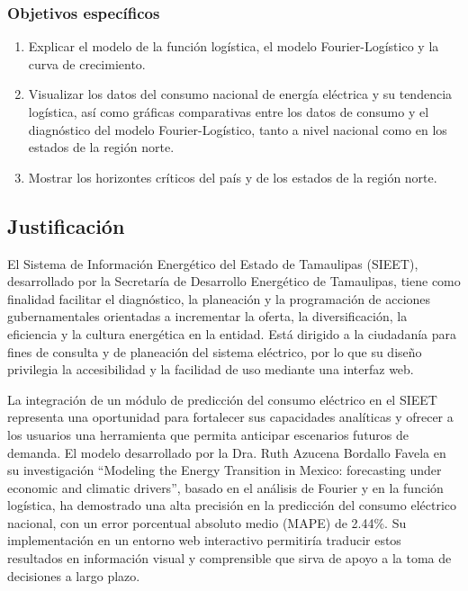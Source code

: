 \subsubsection{Objetivos específicos} \label{subsec:objetivos_especificos}
    \begin{enumerate}
       \item Explicar el modelo de la función logística, el modelo Fourier-Logístico y la curva de crecimiento.
        
	\item Visualizar los datos del consumo nacional de energía eléctrica y su tendencia logística, así como gráficas comparativas entre los datos de consumo y el diagnóstico del modelo Fourier-Logístico, tanto a nivel nacional como en los estados de la región norte.
        \item Mostrar los horizontes críticos del país y de los estados de la región norte.
    \end{enumerate}


\subsection{Justificación} \label{sec:justificacion} %

El Sistema de Información Energético del Estado de Tamaulipas (SIEET), desarrollado por la Secretaría de Desarrollo Energético de Tamaulipas, tiene como finalidad facilitar el diagnóstico, la planeación y la programación de acciones gubernamentales orientadas a incrementar la oferta, la diversificación, la eficiencia y la cultura energética en la entidad. Está dirigido a la ciudadanía para fines de consulta y de planeación del sistema eléctrico, por lo que su diseño privilegia la accesibilidad y la facilidad de uso mediante una interfaz web.

La integración de un módulo de predicción del consumo eléctrico en el SIEET representa una oportunidad para fortalecer sus capacidades analíticas y ofrecer a los usuarios una herramienta que permita anticipar escenarios futuros de demanda. El modelo desarrollado por la Dra. Ruth Azucena Bordallo Favela en su investigación ``Modeling the Energy Transition in Mexico: forecasting under economic and climatic drivers'', basado en el análisis de Fourier y en la función logística, ha demostrado una alta precisión en la predicción del consumo eléctrico nacional, con un error porcentual absoluto medio (MAPE) de 2.44\%\cite{bordallo2025}. Su implementación en un entorno web interactivo permitiría traducir estos resultados en información visual y comprensible que sirva de apoyo a la toma de decisiones a largo plazo.

